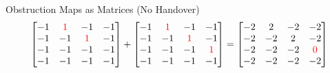 \documentclass[NET,english,beameralt]{tumbeamer}
\begin{document}
\begin{frame}{Obstruction Maps as Matrices (No Handover)}
    $$\begin{bmatrix}
        -1 & \color{red}1 &           -1 & -1           \\
        -1 &           -1 & \color{red}1 & -1           \\
        -1 &           -1 &           -1 & -1           \\
        -1 &           -1 &           -1 & -1           \\
        \end{bmatrix}
        +
        \begin{bmatrix}
        -1 & \color{red}1 &           -1 &           -1 \\
        -1 &           -1 & \color{red}1 &           -1 \\
        -1 &           -1 &           -1 & \color{red}1 \\
        -1 &           -1 &           -1 &           -1 \\
        \end{bmatrix}
        =
        \begin{bmatrix}
        -2 & 2            &  -2          &           -2 \\
        -2 & -2           &  2           &           -2 \\
        -2 & -2           & -2           & \color{red}0 \\
        -2 & -2           & -2           &           -2 \\
    \end{bmatrix}$$
\end{frame} 
\end{document}
